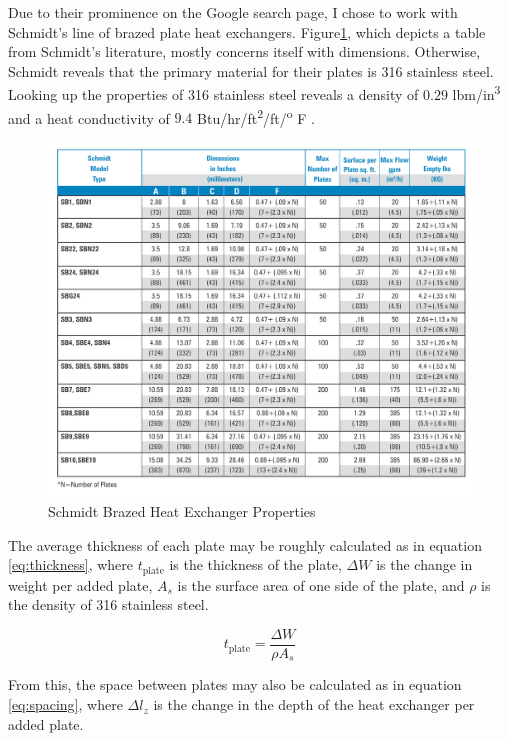 \documentclass[12pt,letterpaper]{article}
\begin{document}
Due to their prominence on the Google search page, I chose to work with Schmidt's line of brazed plate heat exchangers. Figure\ref{tab:schmidt}, which depicts a table from Schmidt's literature, mostly concerns itself with dimensions. Otherwise, Schmidt reveals that the primary material for their plates is 316 stainless steel. Looking up the properties of 316 stainless steel reveals a density of \(0.29\) lbm/in\textsuperscript{3} and a heat conductivity of \(9.4\) Btu/hr/ft\textsuperscript{2}/ft/\textsuperscript{o} F .

\begin{figure}[t]
\center
\label{tab:schmidt}
\includegraphics[width=5.0in]{schmidt_props.png}
\caption{Schmidt Brazed Heat Exchanger Properties}
\end{figure}

The average thickness of each plate may be roughly calculated as in equation \ref{eq:thickness}, where \(t_{\textrm{plate}}\) is the thickness of the plate, \(\Delta W\) is the change in weight per added plate, \(A_s\) is the surface area of one side of the plate, and \(\rho\) is the density of 316 stainless steel.

\begin{equation}
\label{eq:thickness}
t_{\textrm{plate}} = \frac{\Delta W}{\rho A_s}
\end{equation}

From this, the space between plates may also be calculated as in equation \ref{eq:spacing}, where \(\Delta l_z\) is the change in the depth of the heat exchanger per added plate.
\end{document}
